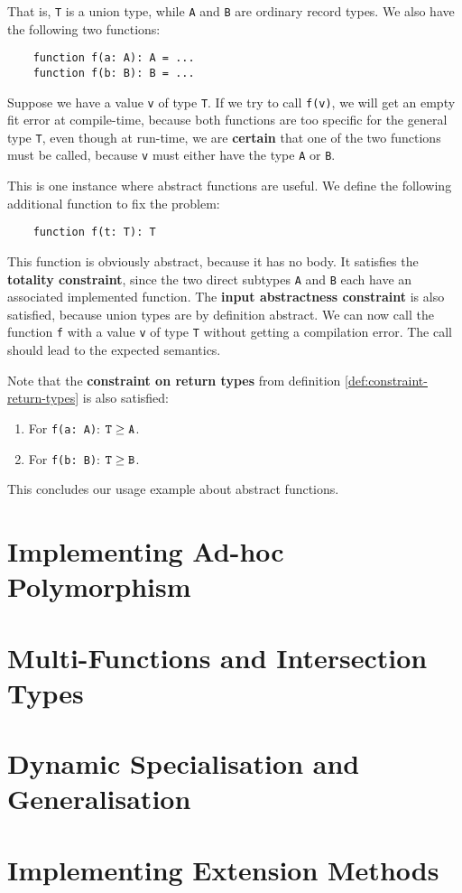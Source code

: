 \noindent That is, \texttt{T} is a union type, while \texttt{A} and \texttt{B} are ordinary record types. We also have the following two functions:
\begin{lstlisting}
    function f(a: A): A = ...
    function f(b: B): B = ...
\end{lstlisting}

\noindent Suppose we have a value \texttt{v} of type \texttt{T}. If we try to call \texttt{f(v)}, we will get an empty fit error at compile-time, because both functions are too specific for the general type \texttt{T}, even though at run-time, we are \textbf{certain} that one of the two functions must be called, because \texttt{v} must either have the type \texttt{A} or \texttt{B}.

This is one instance where abstract functions are useful. We define the following additional function to fix the problem:
\begin{lstlisting}
    function f(t: T): T
\end{lstlisting}

\noindent This function is obviously abstract, because it has no body. It satisfies the \textbf{totality constraint}, since the two direct subtypes \texttt{A} and \texttt{B} each have an associated implemented function. The \textbf{input abstractness constraint} is also satisfied, because union types are by definition abstract. We can now call the function \texttt{f} with a value \texttt{v} of type \texttt{T} without getting a compilation error. The call should lead to the expected semantics. 

Note that the \textbf{constraint on return types} from definition \ref{def:constraint-return-types} is also satisfied:
\begin{enumerate}
	\item For \texttt{f(a: A)}: $\texttt{T} \geq \texttt{A}$.
	\item For \texttt{f(b: B)}: $\texttt{T} \geq \texttt{B}$.
\end{enumerate}

\noindent This concludes our usage example about abstract functions.



\section{Implementing Ad-hoc Polymorphism}



\section{Multi-Functions and Intersection Types}



\section{Dynamic Specialisation and Generalisation}




\section{Implementing Extension Methods}




